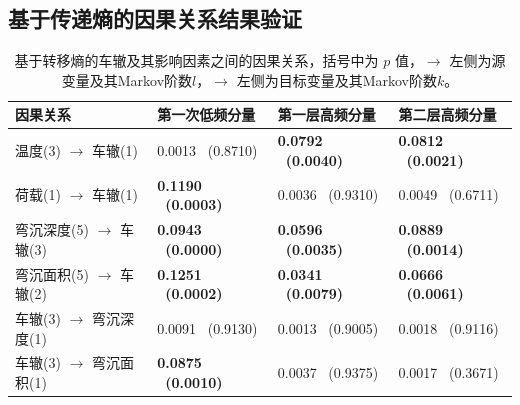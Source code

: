 \subsection{基于传递熵的因果关系结果验证}

\begin{table}[bp]
    \centering
    \caption{基于转移熵的车辙及其影响因素之间的因果关系，括号中为 $p$ 值，$\rightarrow$ 左侧为源变量及其Markov阶数$l$，$\rightarrow$ 左侧为目标变量及其Markov阶数$k$。}
    \begin{tabular}{llll}
     \hline
      因果关系  & 第一次低频分量 & 第一层高频分量 & 第二层高频分量 \\
      \hline
      温度(3) $\rightarrow$ 车辙(1)& 0.0013 \ (0.8710) & \textbf{0.0792 \ (0.0040)}  & \textbf{0.0812 \ (0.0021)}  \\
      \hline
      荷载(1) $\rightarrow$ 车辙(1) & \textbf{0.1190 \ (0.0003)}  & 0.0036 \ (0.9310)  & 0.0049  \ (0.6711)\\
      \hline
      弯沉深度(5) $\rightarrow$ 车辙(3)&  \textbf{0.0943 \ (0.0000)} & \textbf{0.0596 \ (0.0035)}  &  \textbf{0.0889 \ (0.0014)} \\
      \hline
      弯沉面积(5) $\rightarrow$ 车辙(2) & \textbf{0.1251 \ (0.0002)}  &  \textbf{0.0341 \ (0.0079)} & \textbf{0.0666 \ (0.0061)} \\
      \hline
      车辙(3) $\rightarrow$ 弯沉深度(1) & 0.0091 \ (0.9130)  & 0.0013 \ (0.9005)  & 0.0018 \ (0.9116) \\
      \hline
      车辙(3) $\rightarrow$ 弯沉面积(1) & \textbf{ 0.0875 \ (0.0010) }&  0.0037 \ (0.9375) &  0.0017 \ (0.3671)\\
      \hline
\end{tabular}\label{table2}
\end{table}


